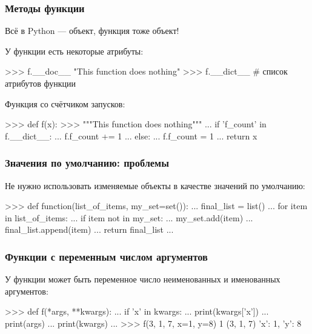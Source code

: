\documentclass[fleqn, xcolor=x11names, 11pt]{beamer}
\begin{document}
\begin{frame}[fragile]\frametitle{Методы функции}
Всё в Python --- объект, функция тоже объект!

\hfill

У функции есть некоторые атрибуты:
\begin{pcode}
>>> f.__doc__
"This function does nothing"
>>> f.__dict__ # список атрибутов функции
{}
\end{pcode}

\hfill

Функция со счётчиком запусков:
\begin{pcode}
>>> def f(x):
>>>    """This function does nothing"""
...    if 'f_count' in f.__dict__:
...        f.f_count += 1
...    else:
...        f.f_count = 1
...    return x
\end{pcode}

\end{frame}


\begin{frame}[fragile]\frametitle{Значения по умолчанию: проблемы}

Не нужно использовать изменяемые объекты в качестве значений по умолчанию:
\begin{pcode}

>>> def function(list_of_items, my_set=set()):
...     final_list = list()
...     for item in list_of_items:
...         if item not in my_set:
...             my_set.add(item)
...             final_list.append(item)
...     return final_list
...
\end{pcode}
\end{frame}

\begin{frame}[fragile]\frametitle{Функции с переменным числом аргументов}
У функции может быть переменное число неименованных и именованных аргументов:
\begin{pcode}

>>> def f(*args, **kwargs):
...    if 'x' in kwargs:
...        print(kwargs['x'])
...    print(args)
...    print(kwargs)
...
>>> f(3, 1, 7, x=1, y=8)
1
(3, 1, 7)
{'x': 1, 'y': 8}
\end{pcode}
\end{frame}
\end{document}
